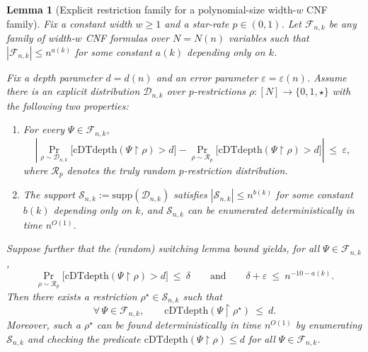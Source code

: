 \documentclass[12pt]{article}
\newtheorem{lemma}[theorem]{Lemma}
\theoremstyle{definition}
\theoremstyle{definition}
\theoremstyle{remark}
\theoremstyle{remark}
\begin{document}
\begin{lemma}[Explicit restriction family for a polynomial-size width-$w$ CNF family]
\label{lem:explicit-restriction-family-proof}
Fix a constant width $w\ge 1$ and a star-rate $p\in(0,1)$.
Let $\mathcal{F}_{n,k}$ be any family of width-$w$ CNF formulas over $N=N(n)$ variables
such that $|\mathcal{F}_{n,k}|\le n^{a(k)}$ for some constant $a(k)$ depending only on $k$.

Fix a depth parameter $d=d(n)$ and an error parameter $\varepsilon=\varepsilon(n)$.
Assume there is an \emph{explicit} distribution $\mathcal{D}_{n,k}$ over $p$-restrictions
$\rho:[N]\to\{0,1,\star\}$ with the following two properties:

\begin{enumerate}
\item[\textnormal{(PR-fooling)}]
For every $\Psi\in\mathcal{F}_{n,k}$,
\[
\left|
\Pr_{\rho\sim \mathcal{D}_{n,k}}\!\big[\mathrm{cDTdepth}(\Psi\!\upharpoonright\!\rho)>d\big]
-
\Pr_{\rho\sim \mathcal{R}_{p}}\!\big[\mathrm{cDTdepth}(\Psi\!\upharpoonright\!\rho)>d\big]
\right|
\ \le\ \varepsilon,
\]
where $\mathcal{R}_{p}$ denotes the truly random $p$-restriction distribution.

\item[\textnormal{(Small support \& explicitness)}]
The support $\mathcal{S}_{n,k}:=\mathrm{supp}(\mathcal{D}_{n,k})$ satisfies
$|\mathcal{S}_{n,k}|\le n^{b(k)}$ for some constant $b(k)$ depending only on $k$,
and $\mathcal{S}_{n,k}$ can be enumerated deterministically in time $n^{O(1)}$.
\end{enumerate}

Suppose further that the (random) switching lemma bound yields, for all $\Psi\in\mathcal{F}_{n,k}$,
\[
\Pr_{\rho\sim \mathcal{R}_{p}}\!\big[\mathrm{cDTdepth}(\Psi\!\upharpoonright\!\rho)>d\big]
\ \le\ \delta
\qquad\text{and}\qquad
\delta+\varepsilon\ \le\ n^{-10-a(k)}.
\]
Then there exists a restriction $\rho^\star\in\mathcal{S}_{n,k}$ such that
\[
\forall\,\Psi\in\mathcal{F}_{n,k},\qquad
\mathrm{cDTdepth}(\Psi\!\upharpoonright\!\rho^\star)\ \le\ d.
\]
Moreover, such a $\rho^\star$ can be found deterministically in time $n^{O(1)}$
by enumerating $\mathcal{S}_{n,k}$ and checking the predicate
$\mathrm{cDTdepth}(\Psi\!\upharpoonright\!\rho)\le d$ for all $\Psi\in\mathcal{F}_{n,k}$.
\end{lemma}
\end{document}
